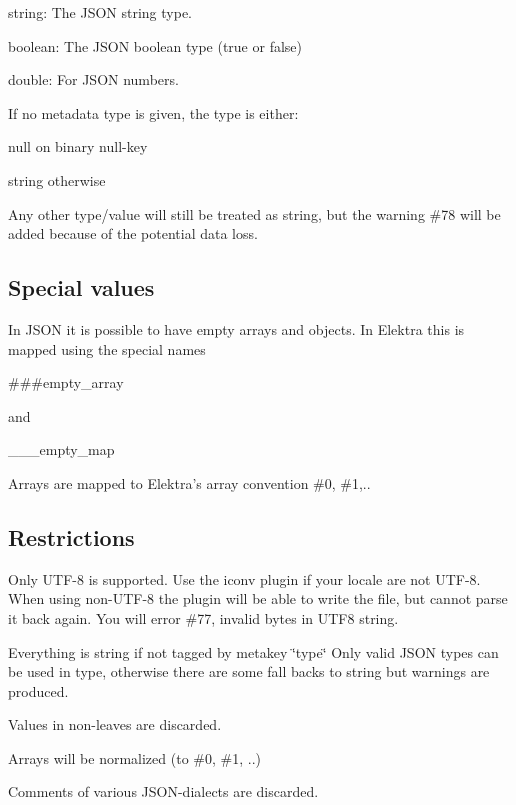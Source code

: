 \begin{DoxyItemize}
\item {\ttfamily string}\+: The J\+S\+ON string type.
\item {\ttfamily boolean}\+: The J\+S\+ON boolean type (true or false)
\item {\ttfamily double}\+: For J\+S\+ON numbers.
\end{DoxyItemize}

If no metadata {\ttfamily type} is given, the type is either\+:


\begin{DoxyItemize}
\item {\ttfamily null} on binary null-\/key
\item {\ttfamily string} otherwise
\end{DoxyItemize}

Any other type/value will still be treated as string, but the warning {\ttfamily \#78} will be added because of the potential data loss.

\subsection*{Special values}

In J\+S\+ON it is possible to have empty arrays and objects. In Elektra this is mapped using the special names \begin{DoxyVerb}###empty_array
\end{DoxyVerb}


and \begin{DoxyVerb}___empty_map
\end{DoxyVerb}


Arrays are mapped to Elektra’s array convention \#0, \#1,..

\subsection*{Restrictions}


\begin{DoxyItemize}
\item Only U\+T\+F-\/8 is supported. Use the {\ttfamily iconv} plugin if your locale are not U\+T\+F-\/8. When using non-\/\+U\+T\+F-\/8 the plugin will be able to write the file, but cannot parse it back again. You will error \#77, invalid bytes in U\+T\+F8 string.
\item Everything is string if not tagged by metakey \char`\"{}type\char`\"{} Only valid J\+S\+ON types can be used in type, otherwise there are some fall backs to string but warnings are produced.
\item Values in non-\/leaves are discarded.
\item Arrays will be normalized (to \#0, \#1, ..)
\item Comments of various J\+S\+O\+N-\/dialects are discarded.
\end{DoxyItemize}

